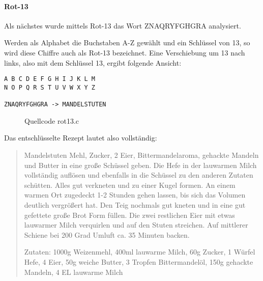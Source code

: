 \paragraph{Rot-13}

Als nächstes wurde mittels Rot-13 das Wort \glqq{}ZNAQRYFGHGRA\grqq{} analysiert.

Werden als Alphabet die Buchstaben A-Z gewählt und ein Schlüssel von 13, so wird
diese Chiffre auch als Rot-13 bezeichnet. Eine Verschiebung um 13 nach links,
also mit dem Schlüssel 13, ergibt folgende Ansicht:

\begin{lstlisting}
A B C D E F G H I J K L M
N O P Q R S T U V W X Y Z

ZNAQRYFGHGRA -> MANDELSTUTEN
\end{lstlisting}

\begin{figure}[tb]

\caption{Quellcode rot13.c}
\label{listingrot13}
\end{figure}

Das entschlüsselte Rezept lautet also vollständig:

{\tiny
\begin{quote}
Mandelstuten
Mehl, Zucker, 2 Eier, Bittermandelaroma, gehackte Mandeln und Butter in eine große Schüssel geben.
Die Hefe in der lauwarmen Milch vollständig auflösen und ebenfalls in die Schüssel zu den anderen Zutaten schütten. Alles gut verkneten und zu einer Kugel formen.
An einem warmen Ort zugedeckt 1-2 Stunden gehen lassen, bis sich das Volumen deutlich vergrößert hat.
Den Teig nochmals gut kneten und in eine gut gefettete große Brot Form füllen.
Die zwei restlichen Eier mit etwas lauwarmer Milch verquirlen und auf den Stuten streichen.
Auf mittlerer Schiene bei 200 Grad Umluft ca. 35 Minuten backen.

Zutaten: 1000g Weizenmehl, 400ml lauwarme Milch, 60g Zucker, 1 Würfel Hefe, 4 Eier, 50g weiche Butter, 3 Tropfen Bittermandelöl,
150g gehackte Mandeln, 4 EL lauwarme Milch
\end{quote}
}
